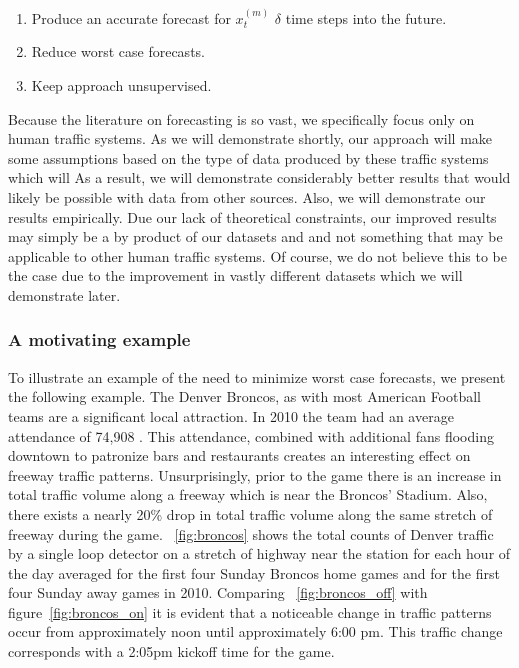 \begin{enumerate}
	\item Produce an accurate forecast for $x_{t}^{(m)}$ $\delta$ time steps into the future.
	\item Reduce worst case forecasts.
	\item Keep approach unsupervised.
\end{enumerate}

Because the literature on forecasting is so vast, we specifically focus only on human traffic systems.  As we will demonstrate shortly, our approach will make some assumptions based on the type of data produced by these traffic systems which will   As a result, we will demonstrate considerably better results that would likely be possible with data from other sources.  Also, we will demonstrate our results empirically.  Due our lack of theoretical constraints, our improved results may simply be a by product of our datasets and and not something that may be applicable to other human traffic systems.  Of course, we do not believe this to be the case due to the improvement in vastly different datasets which we will demonstrate later.


\subsubsection{A motivating example}

To illustrate an example of the need to minimize worst case forecasts, we present the following example.  The Denver Broncos, as with most American Football teams are a significant local attraction.  In 2010 the team had an average attendance of 74,908 \cite{ESPN2013}.  This attendance, combined with additional fans flooding downtown to patronize bars and restaurants creates an interesting effect on freeway traffic patterns.  Unsurprisingly, prior to the game there is an increase in total traffic volume along a freeway which is near the Broncos' Stadium.  Also, there exists a nearly 20\% drop in total traffic volume along the same stretch of freeway during the game.  ~\ref{fig:broncos} shows the total counts of Denver traffic by a single loop detector on a stretch of highway near the station for each hour of the day averaged for the first four Sunday Broncos home games and for the first four Sunday away games in 2010.  Comparing ~\ref{fig:broncos_off} with figure~\ref{fig:broncos_on} it is evident that a noticeable change in traffic patterns occur from approximately noon until approximately 6:00 pm.  This traffic change corresponds with a 2:05pm kickoff time for the game.

